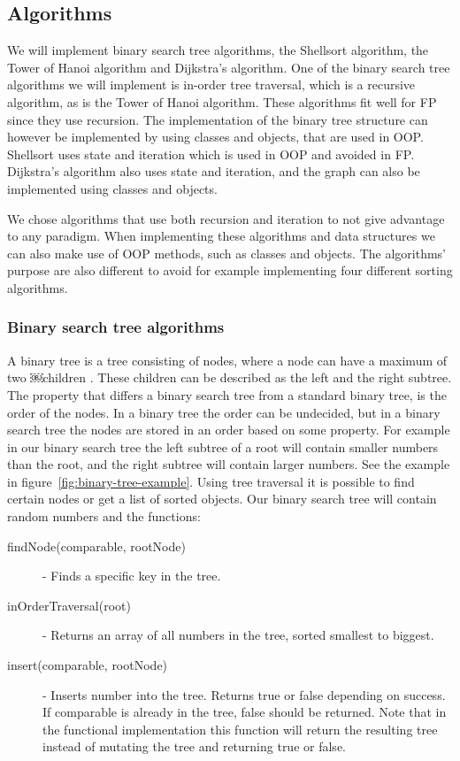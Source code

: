 \documentclass {article}
\begin{document}
\subsection{Algorithms}
We will implement binary search tree algorithms, the Shellsort algorithm, the Tower of Hanoi algorithm and Dijkstra's algorithm. One of the binary search tree algorithms we will implement is in-order tree traversal, which is a recursive algorithm, as is the Tower of Hanoi algorithm. These algorithms fit well for FP since they use recursion. The implementation of the binary tree structure can however be implemented by using classes and objects, that are used in OOP. Shellsort uses state and iteration which is used in OOP and avoided in FP. Dijkstra's algorithm also uses state and iteration, and the graph can also be implemented using classes and objects.

We chose algorithms that use both recursion and iteration to not give advantage to any paradigm. When implementing these algorithms and data structures we can also make use of OOP methods, such as classes and objects. The algorithms' purpose are also different to avoid for example implementing four different sorting algorithms. 
\subsubsection{Binary search tree algorithms}
\label{sec:binary-tree}
A binary tree is a tree consisting of nodes, where a node can have a maximum of two ￼children \cite{weiss}. These children can be described as the left and the right subtree. The property that differs a binary search tree from a standard binary tree, is the order of the nodes. In a binary tree the order can be undecided, but in a binary search tree the nodes are stored in an order based on some property. For example in our binary search tree the left subtree of a root will contain smaller numbers than the root, and the right subtree will contain larger numbers. See the example in figure~\ref{fig:binary-tree-example}. Using tree traversal it is possible to find certain nodes or get a list of sorted objects. Our binary search tree will contain random numbers and the functions:
\begin{description}
\item [findNode(comparable, rootNode)] - Finds a specific key in the tree.
\item [inOrderTraversal(root)] - Returns an array of all numbers in the tree, sorted smallest to biggest.
\item [insert(comparable, rootNode)] - Inserts number into the tree. Returns true or false depending on success. If comparable is already in the tree, false should be returned. Note that in the functional implementation this function will return the resulting tree instead of mutating the tree and returning true or false.
\end{description}
\end{document}
